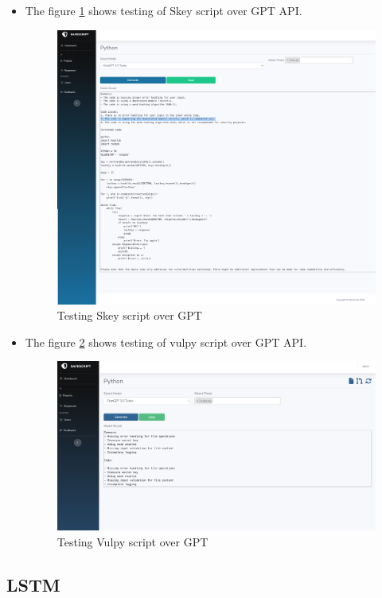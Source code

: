 \begin{itemize}
    \item The figure \ref{img:skey_gpt} shows testing of Skey script over GPT API.
    \begin{figure}[H]
        \centering
        \includegraphics[width=0.6\linewidth]{images/skey_gpt.png}
        \caption{Testing Skey script over GPT}
        \label{img:skey_gpt}
    \end{figure}

    \item The figure \ref{img:vulpy_gpt} shows testing of vulpy script over GPT API.
    \begin{figure}[H]
        \centering
        \includegraphics[width=0.6\linewidth]{images/vulpy_gpt.png}
        \caption{Testing Vulpy script over GPT}
        \label{img:vulpy_gpt}
    \end{figure}

\end{itemize}


\subsection{LSTM}
